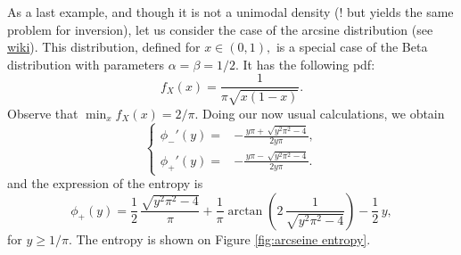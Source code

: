 \documentclass[english,onecolumn]{elsarticle}
\begin{document}
As a last example, and though it is not a unimodal density (! but
yields the same problem for inversion), let us consider the case of
the arcsine distribution (see \href{http://en.wikipedia.org/wiki/Arcsine_distribution}{wiki}).
This distribution, defined for $x\in(0,1),$ is a special case of
the Beta distribution with parameters $\alpha=\beta=1/2.$ It has
the following pdf:
\[
f_{X}(x)=\frac{1}{\pi\sqrt{x(1-x)}}.
\]
Observe that $\min_{x}f_{X}(x)=2/\pi.$ Doing our now usual calculations,
we obtain
\[
\begin{cases}
\phi_{-}'(y)= & -\frac{\, y\pi+\,\sqrt{{y}^{2}{\pi}^{2}-4}}{2y\pi},\\
\phi_{+}'(y)= & -\frac{\, y\pi-\,\sqrt{{y}^{2}{\pi}^{2}-4}}{2y\pi}.
\end{cases}
\]
and the expression of the entropy is 
\[
\phi_{+}(y)=\frac{1}{2}\,{\frac{\sqrt{{y}^{2}{\pi}^{2}-4}}{\pi}}+\frac{1}{\pi}\arctan\left(2\,{\frac{1}{\sqrt{{y}^{2}{\pi}^{2}-4}}}\right)-\frac{1}{2}\, y,
\]
for $y\geq1/\pi$. The entropy is shown on Figure \ref{fig:arcseine entropy}.
\begin{figure}
\end{figure}
\end{document}
